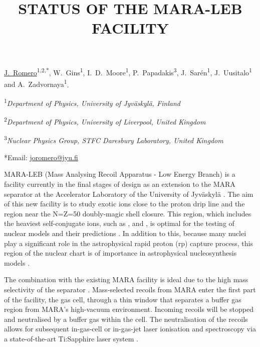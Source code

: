 \documentclass[12pt, a4paper]{article}
\begin{document}

\title{STATUS OF THE MARA-LEB FACILITY}

{\underline{J.~Romero}\textsuperscript{1,2,*}, W.~Gins\textsuperscript{1}, I.~D.~Moore\textsuperscript{1}, P.~Papadakis\textsuperscript{3}, J.~Sarén\textsuperscript{1}, J.~Uusitalo\textsuperscript{1} and A.~Zadvornaya\textsuperscript{1}}.

{\textsuperscript{1}\em Department of Physics, University of Jyväskylä, Finland}

{\textsuperscript{2}\em Department of Physics, University of Liverpool, United Kingdom}

{\textsuperscript{3}\em Nuclear Physics Group, STFC Daresbury Laboratory, United Kingdom}

*Email: \href{mailto:joromero@jyu.fi}{{joromero@jyu.fi}}

\vspace{2\baselineskip}


MARA-LEB (Mass Analysing Recoil Apparatus - Low Energy Branch) is a facility currently in the final stages of design as an extension to the MARA separator at the Accelerator Laboratory of the University of Jyväskylä \cite{MARA}. The aim of this new facility is to study exotic ions close to the proton drip line and the region near the N=Z=50 doubly-magic shell closure. This region, which includes the heaviest self-conjugate ions, such as ,  and  , is optimal for the testing of nuclear models and their predictions \cite{theo}. In addition to this, because many nuclei play a significant role in the astrophysical rapid proton (rp) capture process, this region of the nuclear chart is of importance in astrophysical nucleosynthesis models \cite{astro}. 

The combination with the existing MARA facility is ideal due to the high mass selectivity of the separator \cite{josh}. Mass-selected recoils from MARA enter the first part of the facility, the gas cell, through a thin window that separates a buffer gas region from MARA's high-vacuum environment. Incoming recoils will be stopped and neutralised by a buffer gas within the cell. The neutralisation of the recoils allows for subsequent in-gas-cell or in-gas-jet laser ionisation and spectroscopy via a state-of-the-art Ti:Sapphire laser system \cite{conf}.  
\end{document}
